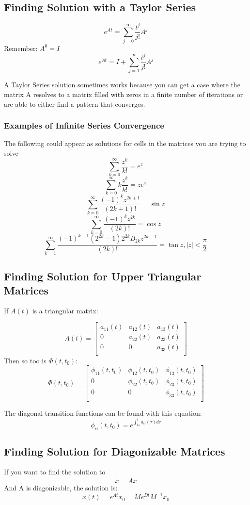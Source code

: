 \documentclass[12pt]{article}
\begin{document}
\subsection*{Finding Solution with a Taylor Series}
$$e^{At} = \sum_{j=0}^\infty \frac{t^j}{j!}A^j$$
\noindent
Remember: $A^0 = I$
$$e^{At} = I+\sum_{j=1}^\infty \frac{t^j}{j!}A^j$$

A Taylor Series solution sometimes works because you can get a case where the matrix A resolves to a matrix filled with zeros in a finite number of iterations or are able to either find a pattern that converges.

\subsubsection*{Examples of Infinite Series Convergence}
The following could appear as solutions for cells in the matrices you are trying to solve
$$\sum_{k=0}^\infty \frac{z^k}{k!} = e^z\,\!$$
$$\sum_{k=0}^\infty k\frac{z^k}{k!} = z e^z\,\!$$
$$\sum_{k=0}^\infty \frac{(-1)^k z^{2k+1}}{(2k+1)!}=\sin z\,\!$$
$$\sum_{k=0}^\infty \frac{(-1)^k z^{2k}}{(2k)!}=\cos z\,\!$$
$$\sum_{k=1}^\infty \frac{(-1)^{k-1}(2^{2k}-1)2^{2k}B_{2k}z^{2k-1}}{(2k)!}=\tan z, |z|<\frac{\pi}{2}\,\!$$

\subsection*{Finding Solution for Upper Triangular Matrices}
If $A(t)$ is a triangular matrix:

$$ A(t) = 
\begin{bmatrix}
a_{11}(t) & a_{12}(t) & a_{13}(t) \\
0 & a_{22}(t) & a_{23}(t) \\
0 & 0& a_{33}(t)\\
\end{bmatrix}
$$
Then so too is $\Phi(t,t_0)$:
$$\Phi(t,t_0) = 
\begin{bmatrix}
\phi_{11}(t,t_0) & \phi_{12}(t,t_0) & \phi_{13}(t,t_0)\\
0 & \phi_{22}(t,t_0) & \phi_{23}(t,t_0) \\
0 & 0 & \phi_{33}(t,t_0)\\
\end{bmatrix}
$$

\noindent
The diagonal transition functions can be found with this equation:
$$\phi_{ii}(t,t_0)=e^{\int_{t_0}^ta_{ii}(\tau)d\tau}$$

\subsection*{Finding Solution for Diagonizable Matrices}
If you want to find the solution to 
$$\dot{\bar{x}}=A\bar{x}$$
And A is diagonizable, the solution is:
$$\bar{x}(t)=e^{At}x_0=Me^{Dt}M^{-1}x_0$$
\end{document}
